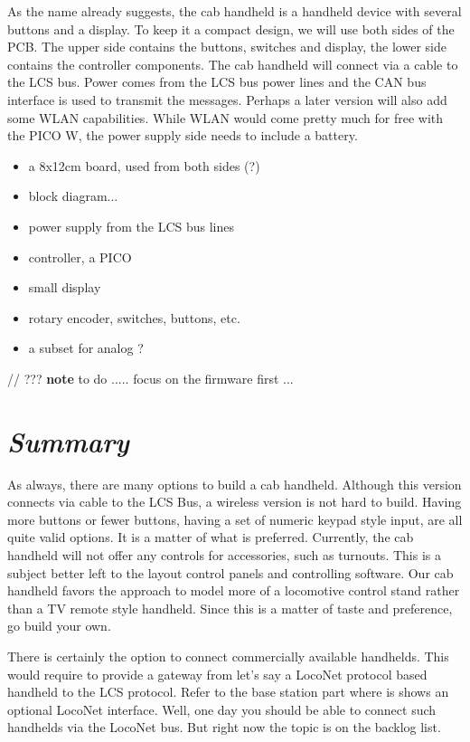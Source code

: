 
As the name already suggests, the cab handheld is a handheld device with several buttons and a display. To keep it a compact design, we will use both sides of the PCB. The upper side contains the buttons, switches and display, the lower side contains the controller components. The cab handheld will connect via a cable to the LCS bus. Power comes from the LCS bus power lines and the CAN bus interface is used to transmit the messages. Perhaps a later version will also add some WLAN capabilities. While WLAN would come pretty much for free with the PICO W, the power supply side needs to include a battery.
\begin{itemize}
\item a 8x12cm board, used from both sides (?)
\item block diagram...
\item power supply from the LCS bus lines
\item controller, a PICO
\item small display
\item rotary encoder, switches, buttons, etc.
\item a subset for analog ?
\end{itemize}

// ??? \textbf{note} to do ..... focus on the firmware first ...

\section{\textit{Summary}}

As always, there are many options to build a cab handheld. Although this version connects via cable to the LCS Bus, a wireless version is not hard to build. Having more buttons or fewer buttons, having a set of numeric keypad style input, are all quite valid options. It is a matter of what is preferred. Currently, the cab handheld will not offer any controls for accessories, such as turnouts. This is a subject better left to the layout control panels and controlling software. Our cab handheld favors the approach to model more of a locomotive control stand rather than a TV remote style handheld. Since this is a matter of taste and preference, go build your own.

There is certainly the option to connect commercially available handhelds. This would require to provide a gateway from let's say a LocoNet protocol based handheld to the LCS protocol. Refer to the base station part where is shows an optional LocoNet interface. Well, one day you should be able to connect such handhelds via the LocoNet bus. But right now the topic is on the backlog list.